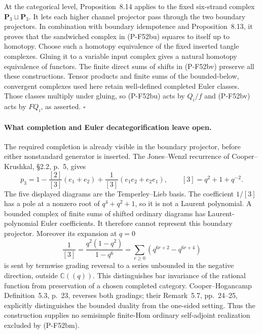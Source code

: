 At the categorical level, Proposition~8.14 applies to the fixed
six-strand complex $\mathbf P_3\sqcup\mathbf P_3$.
It lets each higher channel projector pass through the two
boundary projectors.  In combination with boundary idempotence
and Proposition~8.13, it proves that the sandwiched complex
in (P-F52bu) squares to itself up to homotopy.
Choose such a homotopy equivalence of the fixed inserted
tangle complexes.  Gluing it to a variable input complex
gives a natural homotopy equivalence of functors.
The finite direct sums of shifts in (P-F52bv) preserve all
these constructions.  Tensor products and finite sums of
the bounded-below, convergent complexes used here retain
well-defined completed Euler classes.  Those classes multiply
under gluing, so (P-F52bu) acts by $Q_i/f$ and
(P-F52bv) acts by $FQ_i$, as asserted.
\hfill$\square$

\paragraph{What completion and Euler decategorification leave open.}
The required completion is already visible in the boundary
projector, before either nonstandard generator is inserted.
The Jones--Wenzl recurrence of Cooper--Krushkal, \S2.2, p.~5,
gives
\[
 p_3=1-\frac{[2]}{[3]}(e_1+e_2)
              +\frac1{[3]}(e_1e_2+e_2e_1),\qquad
 [3]=q^2+1+q^{-2}.
                                                               \tag{P-F52bx}
\]
The five displayed diagrams are the Temperley--Lieb basis.
The coefficient $1/[3]$ has a pole at a nonzero root of
$q^4+q^2+1$, so it is not a Laurent polynomial.
A bounded complex of finite sums of shifted ordinary diagrams
has Laurent-polynomial Euler coefficients.  It therefore
cannot represent this boundary projector.
Moreover its expansion at $q=0$
\[
       \frac1{[3]}=\frac{q^2(1-q^2)}{1-q^6}
          =\sum_{r\ge0}(q^{6r+2}-q^{6r+4})
                                                               \tag{P-F52by}
\]
is sent by termwise grading reversal to a series unbounded
in the negative direction, outside $\mathbb C((q))$.
This distinguishes bar invariance of the rational function
from preservation of a chosen completed category.
Cooper--Hogancamp Definition~5.3, p.~23, reverses both
gradings; their Remark~5.7, pp.~24--25, explicitly distinguishes
the bounded duality from the one-sided setting.
Thus the construction supplies no semisimple finite-Hom
ordinary self-adjoint realization excluded by (P-F52bm).

